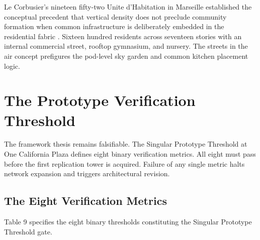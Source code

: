 \documentclass[12pt, letterpaper]{article}
\begin{document}
Le Corbusier's nineteen fifty-two Unite d'Habitation in Marseille established the conceptual precedent that vertical density does not preclude community formation when common infrastructure is deliberately embedded in the residential fabric \citep{le_corbusier_1952}. Sixteen hundred residents across seventeen stories with an internal commercial street, rooftop gymnasium, and nursery. The streets in the air concept prefigures the pod-level sky garden and common kitchen placement logic.

\clearpage
\section{The Prototype Verification Threshold}

The framework thesis remains falsifiable. The Singular Prototype Threshold at One California Plaza defines eight binary verification metrics. All eight must pass before the first replication tower is acquired. Failure of any single metric halts network expansion and triggers architectural revision.

\subsection{The Eight Verification Metrics}

Table 9 specifies the eight binary thresholds constituting the Singular Prototype Threshold gate.
\end{document}

